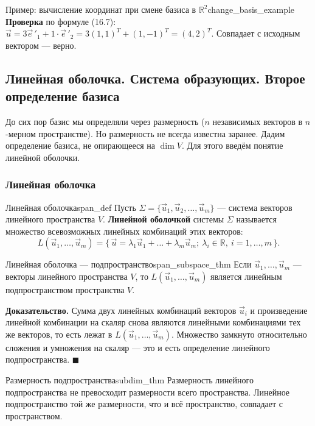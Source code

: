 \documentclass[12pt,a4paper]{article}
\newenvironment{myproof}{\noindent\textbf{Доказательство.}}{\hfill$\blacksquare$}
\begin{document}
\begin{definition}{Пример: вычисление координат при смене
  базиса в $\mathbb{R}^2$}{change_basis_example}
  \textbf{Проверка} по формуле (16.7): $\vec{u} = 3\vec{e}\,'_1 +
  1\cdot\vec{e}\,'_2 = 3(1,1)^T + (1,-1)^T = (4, 2)^T$. Совпадает с
  исходным вектором --- верно.
\end{definition}

\subsection*{Линейная оболочка. Система образующих.
Второе определение базиса}

До сих пор базис мы определяли через размерность ($n$ независимых
векторов в $n$-мерном пространстве). Но размерность не всегда известна
заранее. Дадим определение базиса, не опирающееся на $\dim V$. Для
этого введём понятие линейной оболочки.

\subsubsection*{Линейная оболочка}

\begin{definition}{Линейная оболочка}{span_def}
  Пусть $\Sigma = \{\vec{u}_1, \vec{u}_2, \dots, \vec{u}_m\}$ ---
  система векторов линейного пространства $V$. \textbf{Линейной
  оболочкой} системы $\Sigma$ называется множество всевозможных
  линейных комбинаций этих векторов:
  \[
    L(\vec{u}_1, \dots, \vec{u}_m) = \{\, \vec{u} = \lambda_1\vec{u}_1
      + \dots + \lambda_m\vec{u}_m; \ \lambda_i \in \mathbb{R}, \ i = 1,
    \dots, m \,\}.
  \]
\end{definition}

\begin{theorem}{Линейная оболочка --- подпространство}{span_subspace_thm}
  Если $\vec{u}_1, \dots, \vec{u}_m$ --- векторы линейного
  пространства $V$, то $L(\vec{u}_1, \dots, \vec{u}_m)$ является
  линейным подпространством пространства $V$.
\end{theorem}

\begin{myproof}
  Сумма двух линейных комбинаций векторов $\vec{u}_i$ и произведение
  линейной комбинации на скаляр снова являются линейными комбинациями
  тех же векторов, то есть лежат в $L(\vec{u}_1, \dots, \vec{u}_m)$.
  Множество замкнуто относительно сложения и умножения на скаляр ---
  это и есть определение линейного подпространства.
\end{myproof}

\begin{theorem}{Размерность подпространства}{subdim_thm}
  Размерность линейного подпространства не превосходит размерности
  всего пространства. Линейное подпространство той же размерности, что
  и всё пространство, совпадает с пространством.
\end{theorem}
\end{document}
